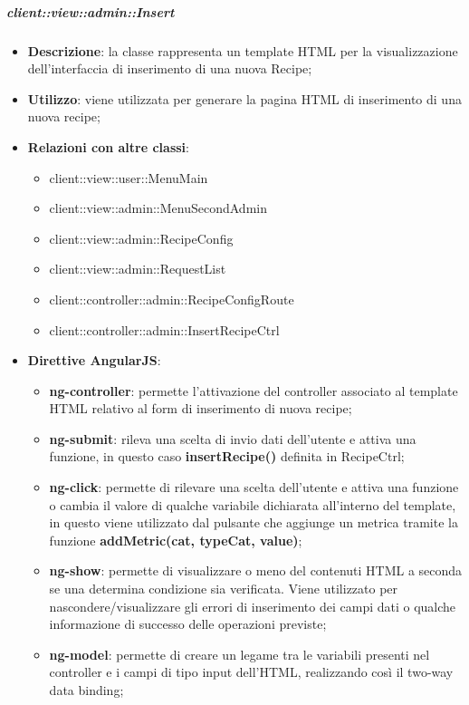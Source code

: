 		\subparagraph{client::view::admin::Insert} %
		\label{subp:bdsm_app_client_view_admin_insert}

			\begin{itemize}
				\item \textbf{Descrizione}: la classe rappresenta un template HTML per la visualizzazione dell'interfaccia di inserimento di una nuova Recipe;
				\item \textbf{Utilizzo}: viene utilizzata per generare la pagina HTML di inserimento di una nuova recipe;
				\item \textbf{Relazioni con altre classi}:
					\begin{itemize}
						\item client::view::user::MenuMain
						\item client::view::admin::MenuSecondAdmin
						\item client::view::admin::RecipeConfig
						\item client::view::admin::RequestList
						\item client::controller::admin::RecipeConfigRoute
						\item client::controller::admin::InsertRecipeCtrl
					\end{itemize}
				\item \textbf{Direttive AngularJS}:
					\begin{itemize}
						\item \textbf{ng-controller}: permette l'attivazione del controller associato al template HTML relativo al form di inserimento di nuova recipe;
						\item \textbf{ng-submit}: rileva una scelta di invio dati dell'utente e attiva una funzione, in questo caso \textbf{insertRecipe()} definita in RecipeCtrl;
						\item \textbf{ng-click}: permette di rilevare una scelta dell'utente e attiva una funzione o cambia il valore di qualche variabile dichiarata all'interno del template, in questo viene utilizzato dal pulsante che aggiunge un metrica tramite la funzione \textbf{addMetric(cat, typeCat, value)};
						\item \textbf{ng-show}: permette di visualizzare o meno del contenuti HTML a seconda se una determina condizione sia verificata. Viene utilizzato per nascondere/visualizzare gli errori di inserimento dei campi dati o qualche informazione di successo delle operazioni previste;
						\item \textbf{ng-model}: permette di creare un legame tra le variabili presenti nel controller e i campi di tipo input dell'HTML, realizzando così il two-way data binding;

\end{itemize}
\end{itemize}
